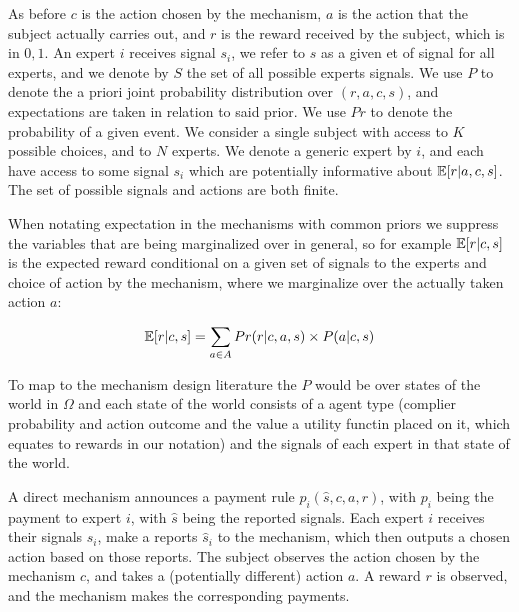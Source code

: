 As before $c$ is the action chosen by the mechanism, $a$ is the action that the subject actually carries out, and $r$ is the reward received by the subject, which is in ${0,1}$. An expert $i$ receives signal $s_i$, we refer to $s$ as a given et of signal for all experts, and we denote by $S$ the set of all possible experts signals.
We use $P$ to denote the a priori joint probability distribution over $(r,a,c,s)$, and expectations are taken in relation to said prior.
We use $Pr$ to denote the probability of a given event.
We consider a single subject with access to $K$ possible choices, and to $N$ experts. We denote a generic expert by $i$, and each have access to some signal $s_i$ which are potentially informative about $\operatorname*{\mathbb E}[r|a,c,s]$. The set of possible signals and actions are both finite.


When notating expectation in the mechanisms with common priors we suppress the variables that are being marginalized over in general, so for example $\operatorname*{\mathbb E}[r|c,s]$ is the expected reward conditional on a given set of signals to the experts and choice of action by the mechanism, where we  marginalize over the actually taken action $a$:

\[
\operatorname*{\mathbb E}[r|c,s] = \sum_{a \in A} Pr(r|c,a,s) \times P(a|c,s) 
\]


To map to the mechanism design literature the $P$ would be over states of the world in $\Omega$ and each state of the world consists of a agent type (complier probability and action outcome and the value a utility functin placed on it, which equates to rewards in our notation) and the signals of each expert in that state of the world.



A direct mechanism announces a payment rule $p_i(\hat{s}, c,a,r)$, with $p_i$ being the payment to expert $i$, with $\hat{s}$ being the reported signals. 
Each expert $i$ receives their signals $s_i$, make a reports $\hat{s}_i$ to the mechanism, which then outputs a chosen action based on those reports.
The subject observes the action chosen by the mechanism $c$, and takes a (potentially different) action $a$. A reward $r$ is observed, and the mechanism makes the corresponding payments.

